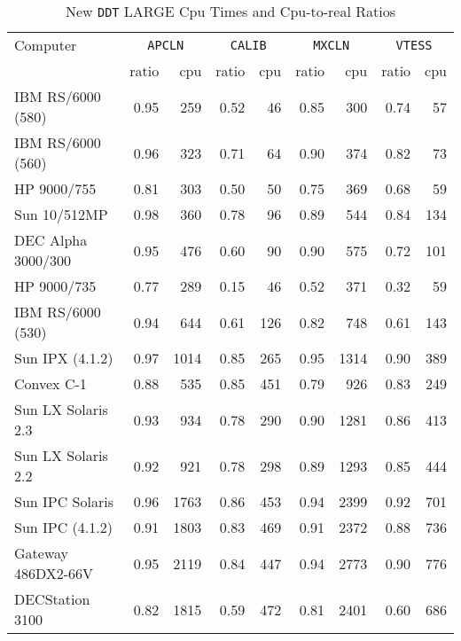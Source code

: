 \begin{table}
\protect\begin{center}
\protect\begin{tabular}{|l|rr|rr|rr|rr|} \hline
Computer& \multicolumn{2}{c|}{{\tt APCLN}} &
     \multicolumn{2}{c|}{{\tt CALIB}} &
     \multicolumn{2}{c|}{{\tt MXCLN}} &
     \multicolumn{2}{c|}{{\tt VTESS}} \\
  & ratio & cpu &
    ratio & cpu &
    ratio & cpu &
    ratio & cpu \\
\hline
IBM RS/6000 (580) & 0.95 &  259 & 0.52 &  46 & 0.85 &  300 & 0.74 &  57 \\
IBM RS/6000 (560) & 0.96 &  323 & 0.71 &  64 & 0.90 &  374 & 0.82 &  73 \\
HP 9000/755       & 0.81 &  303 & 0.50 &  50 & 0.75 &  369 & 0.68 &  59 \\
Sun 10/512MP      & 0.98 &  360 & 0.78 &  96 & 0.89 &  544 & 0.84 & 134 \\
DEC Alpha 3000/300& 0.95 &  476 & 0.60 &  90 & 0.90 &  575 & 0.72 & 101 \\
HP 9000/735       & 0.77 &  289 & 0.15 &  46 & 0.52 &  371 & 0.32 &  59 \\
IBM RS/6000 (530) & 0.94 &  644 & 0.61 & 126 & 0.82 &  748 & 0.61 & 143 \\
Sun IPX (4.1.2)   & 0.97 & 1014 & 0.85 & 265 & 0.95 & 1314 & 0.90 & 389 \\
Convex C-1        & 0.88 &  535 & 0.85 & 451 & 0.79 &  926 & 0.83 & 249 \\
Sun LX Solaris 2.3& 0.93 &  934 & 0.78 & 290 & 0.90 & 1281 & 0.86 & 413 \\
Sun LX Solaris 2.2& 0.92 &  921 & 0.78 & 298 & 0.89 & 1293 & 0.85 & 444 \\
Sun IPC Solaris   & 0.96 & 1763 & 0.86 & 453 & 0.94 & 2399 & 0.92 & 701 \\
Sun IPC (4.1.2)   & 0.91 & 1803 & 0.83 & 469 & 0.91 & 2372 & 0.88 & 736 \\
Gateway 486DX2-66V& 0.95 & 2119 & 0.84 & 447 & 0.94 & 2773 & 0.90 & 776 \\
DECStation 3100   & 0.82 & 1815 & 0.59 & 472 & 0.81 & 2401 & 0.60 & 686 \\
\hline
\end{tabular}
\end{center}
\caption{New {\tt DDT} LARGE Cpu Times and Cpu-to-real Ratios}
\label{ta:cputimes}
\end{table}

